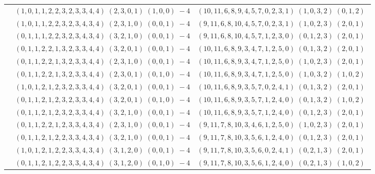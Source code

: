 \documentclass[11pt]{article}
\begin{document}
\begin{longtable}[l]{|c|c|c|}
 \cline{2-3} 
 & $(1 ,0 ,1 ,1 ,2 ,2 ,3 ,2 ,3 ,3 ,4 ,4) \;(2 ,3 ,0 ,1) \;(1 ,0 ,0) \;-4$ & $(10 ,11 ,6 ,8 ,9 ,4 ,5 ,7 ,0 ,2 ,3 ,1) \;(1 ,0 ,3 ,2) \;(0 ,1 ,2) \;$\\ 
 \cline{2-3} 
 & $(1 ,0 ,1 ,1 ,2 ,2 ,3 ,2 ,3 ,4 ,3 ,4) \;(2 ,3 ,1 ,0) \;(0 ,0 ,1) \;-4$ & $(9 ,11 ,6 ,8 ,10 ,4 ,5 ,7 ,0 ,2 ,3 ,1) \;(1 ,0 ,2 ,3) \;(2 ,0 ,1) \;$\\ 
 \cline{2-3} 
 & $(0 ,1 ,1 ,1 ,2 ,2 ,3 ,2 ,3 ,4 ,3 ,4) \;(3 ,2 ,1 ,0) \;(0 ,0 ,1) \;-4$ & $(9 ,11 ,6 ,8 ,10 ,4 ,5 ,7 ,1 ,2 ,3 ,0) \;(0 ,1 ,2 ,3) \;(2 ,0 ,1) \;$\\ 
 \cline{2-3} 
 & $(0 ,1 ,1 ,2 ,2 ,1 ,3 ,2 ,3 ,3 ,4 ,4) \;(3 ,2 ,0 ,1) \;(0 ,0 ,1) \;-4$ & $(10 ,11 ,6 ,8 ,9 ,3 ,4 ,7 ,1 ,2 ,5 ,0) \;(0 ,1 ,3 ,2) \;(2 ,0 ,1) \;$\\ 
 \cline{2-3} 
 & $(0 ,1 ,1 ,2 ,2 ,1 ,3 ,2 ,3 ,3 ,4 ,4) \;(2 ,3 ,1 ,0) \;(0 ,0 ,1) \;-4$ & $(10 ,11 ,6 ,8 ,9 ,3 ,4 ,7 ,1 ,2 ,5 ,0) \;(1 ,0 ,2 ,3) \;(2 ,0 ,1) \;$\\ 
 \cline{2-3} 
 & $(0 ,1 ,1 ,2 ,2 ,1 ,3 ,2 ,3 ,3 ,4 ,4) \;(2 ,3 ,0 ,1) \;(0 ,1 ,0) \;-4$ & $(10 ,11 ,6 ,8 ,9 ,3 ,4 ,7 ,1 ,2 ,5 ,0) \;(1 ,0 ,3 ,2) \;(1 ,0 ,2) \;$\\ 
 \cline{2-3} 
 & $(1 ,0 ,1 ,2 ,1 ,2 ,3 ,2 ,3 ,3 ,4 ,4) \;(3 ,2 ,0 ,1) \;(0 ,0 ,1) \;-4$ & $(10 ,11 ,6 ,8 ,9 ,3 ,5 ,7 ,0 ,2 ,4 ,1) \;(0 ,1 ,3 ,2) \;(2 ,0 ,1) \;$\\ 
 \cline{2-3} 
 & $(0 ,1 ,1 ,2 ,1 ,2 ,3 ,2 ,3 ,3 ,4 ,4) \;(3 ,2 ,0 ,1) \;(0 ,1 ,0) \;-4$ & $(10 ,11 ,6 ,8 ,9 ,3 ,5 ,7 ,1 ,2 ,4 ,0) \;(0 ,1 ,3 ,2) \;(1 ,0 ,2) \;$\\ 
 \cline{2-3} 
 & $(0 ,1 ,1 ,2 ,1 ,2 ,3 ,2 ,3 ,3 ,4 ,4) \;(3 ,2 ,1 ,0) \;(0 ,0 ,1) \;-4$ & $(10 ,11 ,6 ,8 ,9 ,3 ,5 ,7 ,1 ,2 ,4 ,0) \;(0 ,1 ,2 ,3) \;(2 ,0 ,1) \;$\\ 
 \cline{2-3} 
 & $(0 ,1 ,1 ,2 ,2 ,1 ,2 ,3 ,3 ,4 ,3 ,4) \;(2 ,3 ,1 ,0) \;(0 ,0 ,1) \;-4$ & $(9 ,11 ,7 ,8 ,10 ,3 ,4 ,6 ,1 ,2 ,5 ,0) \;(1 ,0 ,2 ,3) \;(2 ,0 ,1) \;$\\ 
 \cline{2-3} 
 & $(0 ,1 ,1 ,2 ,1 ,2 ,2 ,3 ,3 ,4 ,3 ,4) \;(3 ,2 ,1 ,0) \;(0 ,0 ,1) \;-4$ & $(9 ,11 ,7 ,8 ,10 ,3 ,5 ,6 ,1 ,2 ,4 ,0) \;(0 ,1 ,2 ,3) \;(2 ,0 ,1) \;$\\ 
 \cline{2-3} 
 & $(1 ,0 ,1 ,2 ,1 ,2 ,2 ,3 ,3 ,4 ,3 ,4) \;(3 ,1 ,2 ,0) \;(0 ,0 ,1) \;-4$ & $(9 ,11 ,7 ,8 ,10 ,3 ,5 ,6 ,0 ,2 ,4 ,1) \;(0 ,2 ,1 ,3) \;(2 ,0 ,1) \;$\\ 
 \cline{2-3} 
 & $(0 ,1 ,1 ,2 ,1 ,2 ,2 ,3 ,3 ,4 ,3 ,4) \;(3 ,1 ,2 ,0) \;(0 ,1 ,0) \;-4$ & $(9 ,11 ,7 ,8 ,10 ,3 ,5 ,6 ,1 ,2 ,4 ,0) \;(0 ,2 ,1 ,3) \;(1 ,0 ,2) \;$\\ 

\end{longtable}
\end{document}
